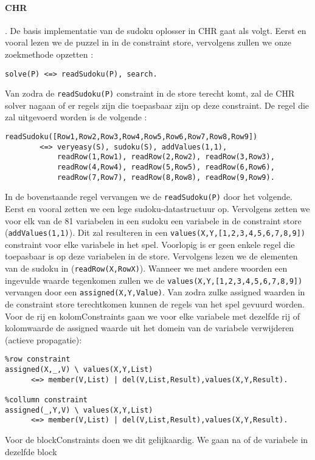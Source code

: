 \paragraph{CHR}.\newline
De basis implementatie van de sudoku oplosser in CHR gaat als volgt. Eerst en vooral lezen we de puzzel in 
in de constraint store, vervolgens zullen we onze zoekmethode opzetten :
\begin{verbatim}
solve(P) <=> readSudoku(P), search.
\end{verbatim}
Van zodra de \verb|readSudoku(P)| constraint in de store terecht komt, zal de CHR solver nagaan of er regels
zijn die toepasbaar zijn op deze constraint. De regel die zal uitgevoerd worden is de volgende :
\begin{verbatim}
readSudoku([Row1,Row2,Row3,Row4,Row5,Row6,Row7,Row8,Row9]) 
        <=> veryeasy(S), sudoku(S), addValues(1,1), 
            readRow(1,Row1), readRow(2,Row2), readRow(3,Row3), 
            readRow(4,Row4), readRow(5,Row5), readRow(6,Row6), 
            readRow(7,Row7), readRow(8,Row8), readRow(9,Row9).
\end{verbatim}
In de bovenstaande regel vervangen we de \verb|readSudoku(P)| door het volgende. Eerst en vooral zetten we
een lege sudoku-datastructuur op. Vervolgens zetten we voor elk van de 81 variabelen in een sudoku een
variabele in de constraint store (\verb|addValues(1,1)|). Dit zal resulteren in een \verb|values(X,Y,[1,2,3,4,5,6,7,8,9])| constraint
voor elke variabele in het spel. Voorlopig is er geen enkele regel die toepasbaar is op deze variabelen in
de store. Vervolgens lezen we de elementen van de sudoku in (\verb|readRow(X,RowX)|). Wanneer we met andere woorden
een ingevulde waarde tegenkomen zullen we de \verb|values(X,Y,[1,2,3,4,5,6,7,8,9])| vervangen
door een \verb|assigned(X,Y,Value)|. Van zodra zulke assigned waarden in de constraint store
terechtkomen kunnen de regels van het spel gevuurd worden. Voor de rij en kolomConstraints
gaan we voor elke variabele met dezelfde rij of kolomwaarde de assigned waarde uit het
domein van de variabele verwijderen (actieve propagatie):
\begin{verbatim}
%row constraint
assigned(X,_,V) \ values(X,Y,List) 
      <=> member(V,List) | del(V,List,Result),values(X,Y,Result). 

%collumn constraint
assigned(_,Y,V) \ values(X,Y,List) 
      <=> member(V,List) | del(V,List,Result),values(X,Y,Result).
\end{verbatim}
Voor de blockConstraints doen we dit gelijkaardig. We gaan na of de variabele in dezelfde block

